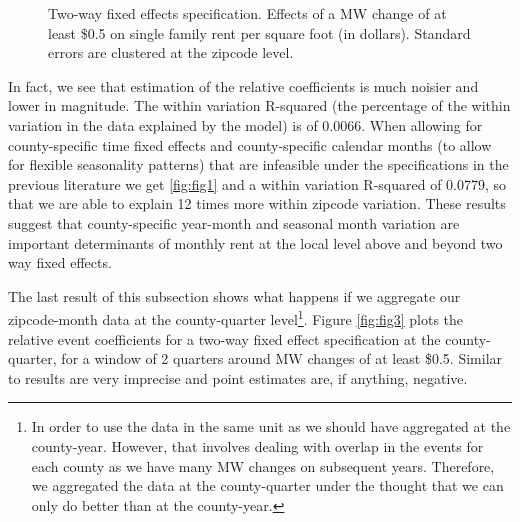 \documentclass{article}
\begin{document}
\begin{figure}[h!]
    \centering
    \caption{Two-way fixed effects specification. Effects of a MW change of at least \$0.5 on single family rent per square foot (in dollars). Standard errors are clustered at the zipcode level.}
    \label{fig:fig2}
\end{figure}

In fact, we see that estimation of the relative coefficients is much noisier and lower in magnitude. The within variation R-squared (the percentage of the within variation in the data explained by the model) is of 0.0066. When allowing for county-specific time fixed effects and county-specific calendar months (to allow for flexible seasonality patterns) that are infeasible under the specifications in the previous literature we get \ref{fig:fig1} and a within variation R-squared of 0.0779, so that we are able to explain 12 times more within zipcode variation. These results suggest that county-specific year-month and seasonal month variation are important determinants of monthly rent at the local level above and beyond two way fixed effects.

The last result of this subsection shows what happens if we aggregate our zipcode-month data at the county-quarter level\footnote{In order to use the data in the same unit as \textcite{tidemann2018mw,yamagishi2019minimum} we should have aggregated at the county-year. However, that involves dealing with overlap in the events for each county as we have many MW changes on subsequent years. Therefore, we aggregated the data at the county-quarter under the thought that we can only do better than at the county-year. }. Figure \ref{fig:fig3} plots the relative event coefficients for a two-way fixed effect specification at the county-quarter, for a window of 2 quarters around MW changes of at least \$0.5. Similar to \textcite{tidemann2018mw} results are very imprecise and point estimates are, if anything, negative. 
\end{document}

